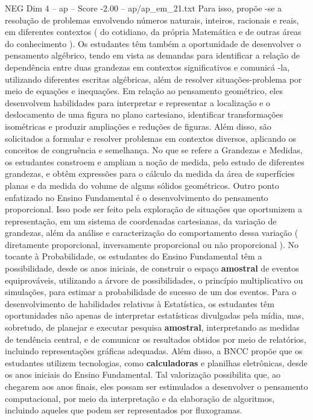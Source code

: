 \begin{textsample}{NEG Dim 4 – ap – Score -2.00 – ap/ap\_em\_21.txt}
Para isso, propõe -se a resolução de problemas envolvendo números naturais, inteiros, racionais e reais, em diferentes contextos ( do cotidiano, da própria Matemática e de outras áreas do conhecimento ).
Os estudantes têm também a oportunidade de desenvolver o pensamento algébrico, tendo em vista as demandas para identificar a relação de dependência entre duas grandezas em contextos significativos e comunicá -la, utilizando diferentes escritas algébricas, além de resolver situações-problema por meio de equações e inequações.
Em relação ao pensamento geométrico, eles desenvolvem habilidades para interpretar e representar a localização e o deslocamento de uma figura no plano cartesiano, identificar transformações isométricas e produzir ampliações e reduções de figuras.
Além disso, são solicitados a formular e resolver problemas em contextos diversos, aplicando os conceitos de congruência e semelhança.
No que se refere a Grandezas e Medidas, os estudantes constroem e ampliam a noção de medida, pelo estudo de diferentes grandezas, e obtêm expressões para o cálculo da medida da área de superfícies planas e da medida do volume de alguns sólidos geométricos.
Outro ponto enfatizado no Ensino Fundamental é o desenvolvimento do pensamento proporcional.
Isso pode ser feito pela exploração de situações que oportunizem a representação, em um sistema de coordenadas cartesianas, da variação de grandezas, além da análise e caracterização do comportamento dessa variação ( diretamente proporcional, inversamente proporcional ou não proporcional ).
No tocante à Probabilidade, os estudantes do Ensino Fundamental têm a possibilidade, desde os anos iniciais, de construir o espaço \textbf{amostral} de eventos equiprováveis, utilizando a árvore de possibilidades, o princípio multiplicativo ou simulações, para estimar a probabilidade de sucesso de um dos eventos.
Para o desenvolvimento de habilidades relativas à Estatística, os estudantes têm oportunidades não apenas de interpretar estatísticas divulgadas pela mídia, mas, sobretudo, de planejar e executar pesquisa \textbf{amostral}, interpretando as medidas de tendência central, e de comunicar os resultados obtidos por meio de relatórios, incluindo representações gráficas adequadas.
Além disso, a BNCC propõe que os estudantes utilizem tecnologias, como \textbf{calculadoras} e planilhas eletrônicas, desde os anos iniciais do Ensino Fundamental.
Tal valorização possibilita que, ao chegarem aos anos finais, eles possam ser estimulados a desenvolver o pensamento computacional, por meio da interpretação e da elaboração de algoritmos, incluindo aqueles que podem ser representados por fluxogramas.

\end{textsample}

